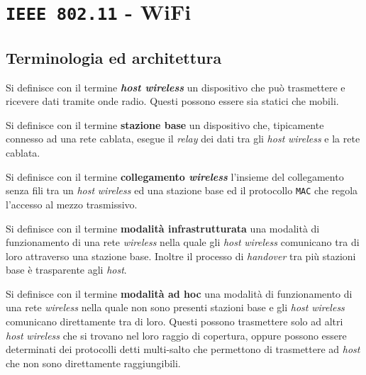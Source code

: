 \section{\texttt{IEEE 802.11} - WiFi}
    \subsection{Terminologia ed architettura}
        \begin{definition}
            Si definisce con il termine \textbf{\textit{host wireless}} un dispositivo che può trasmettere e ricevere dati tramite onde radio. Questi possono essere sia statici che mobili.
        \end{definition}
        \begin{definition}
            Si definisce con il termine \textbf{stazione base} un dispositivo che, tipicamente connesso ad una rete cablata, esegue il \textit{relay} dei dati tra gli \textit{host} \textit{wireless} e la rete cablata.
        \end{definition}
        \begin{definition}
            Si definisce con il termine \textbf{collegamento \textit{wireless}} l'insieme del collegamento senza fili tra un \textit{host} \textit{wireless} ed una stazione base ed il protocollo \texttt{MAC} che regola l'accesso al mezzo trasmissivo.
        \end{definition}
        \begin{definition}
            Si definisce con il termine \textbf{modalità infrastrutturata} una modalità di funzionamento di una rete \textit{wireless} nella quale gli \textit{host} \textit{wireless} comunicano tra di loro attraverso una stazione base. Inoltre il processo di \textit{handover} tra più stazioni base è trasparente agli \textit{host}.
        \end{definition}
        \begin{definition}
            Si definisce con il termine \textbf{modalità ad hoc} una modalità di funzionamento di una rete \textit{wireless} nella quale non sono presenti stazioni base e gli \textit{host} \textit{wireless} comunicano direttamente tra di loro. Questi possono trasmettere solo ad altri \textit{host} \textit{wireless} che si trovano nel loro raggio di copertura, oppure possono essere determinati dei protocolli detti multi-salto che permettono di trasmettere ad \textit{host} che non sono direttamente raggiungibili.
        \end{definition}
